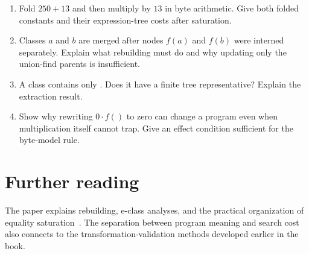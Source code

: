 \begin{enumerate}
\item\label{ex:ch62-wrap} Fold $250+13$ and then multiply by $13$ in byte arithmetic.
Give both folded constants and their expression-tree costs after saturation.
\item\label{ex:ch62-congruence} Classes $a$ and $b$ are merged after nodes $f(a)$ and $f(b)$ were interned separately.
Explain what rebuilding must do and why updating only the union-find parents is insufficient.
\item\label{ex:ch62-cycle} A class contains only .
Does it have a finite tree representative? Explain the extraction result.
\item\label{ex:ch62-effects} Show why rewriting $0\cdot f()$ to zero can change a program even when multiplication itself cannot trap.
Give an effect condition sufficient for the byte-model rule.
\end{enumerate}

\section{Further reading}
\label{sec:ch62-reading}

The  paper explains rebuilding, e-class analyses, and the practical organization of equality saturation~\cite{willsey-2021-egg}.
The separation between program meaning and search cost also connects to the transformation-validation methods developed earlier in the book.
